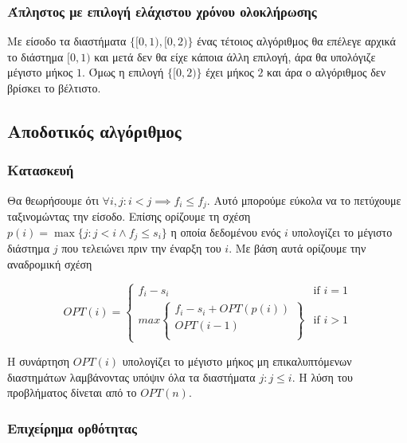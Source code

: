 \subsubsection{Άπληστος με επιλογή ελάχιστου χρόνου ολοκλήρωσης}

Με είσοδο τα διαστήματα $\{[0, 1), [0, 2)\}$ ένας τέτοιος αλγόριθμος θα επέλεγε
αρχικά το διάστημα $[0, 1)$ και μετά δεν θα είχε κάποια άλλη επιλογή, άρα θα
υπολόγιζε μέγιστο μήκος $1$. Όμως η επιλογή $\{[0, 2)\}$ έχει μήκος $2$ και άρα
ο αλγόριθμος δεν βρίσκει το βέλτιστο.

\subsection{Αποδοτικός αλγόριθμος}

\subsubsection{Κατασκευή}

Θα θεωρήσουμε ότι $\forall i, j: i < j \implies f_{i} \leq f_{j}$. Αυτό
μπορούμε εύκολα να το πετύχουμε ταξινομώντας την είσοδο. Επίσης ορίζουμε τη
σχέση $p(i) = \max \{ j: j < i \land f_{j} \leq s_{i} \}$ η οποία δεδομένου
ενός $i$ υπολογίζει το μέγιστο διάστημα $j$ που τελειώνει πριν την έναρξη του
$i$. Με βάση αυτά ορίζουμε την αναδρομική σχέση

\[ OPT(i) = \left\{
              \begin{array}{lr}
                  f_{i} - s_{i}                           & \text{if } i = 1 \\
                  max \left\{
                    \begin{array}{lr}
                      f_{i} - s_{i} + OPT(p(i)) \\
                      OPT(i - 1) \\
                    \end{array}
                  \right\}                                & \text{if } i > 1
              \end{array}
            \right.
\]

Η συνάρτηση $OPT(i)$ υπολογίζει το μέγιστο μήκος μη επικαλυπτόμενων διαστημάτων
λαμβάνοντας υπόψιν όλα τα διαστήματα $j: j \leq i$. Η λύση του προβλήματος
δίνεται από το $OPT(n)$.

\subsubsection{Επιχείρημα ορθότητας}

